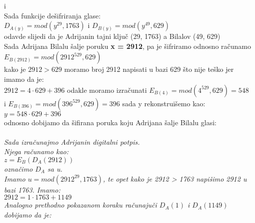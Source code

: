 \documentclass[12pt]{article}
\begin{document}
\begin{enumerate}
\begin{center}
{          i  \\ \vspace{0.25cm} Sada funkcije dešifriranja glase: \\ \vspace{0.15cm} $D_{A(y)} = mod(y^{29}, 1763)$ i $D_{B(y)} = mod(y^{49}, 629)$ \\ \vspace{0.2cm}odavde slijedi da je Adrijanin tajni ključ (29, 1763) a Bilalov (49, 629)\\\vspace{0.20cm} Sada Adrijana Bilalu šalje poruku \textbf{x = 2912}, pa je šifriramo odnosno računamo\\ \vspace{0.15cm} $E_{B(2912)} = mod(2912^{529}, 629)$\\ \vspace{0.15cm} kako je $2912 > 629$ moramo broj 2912 napisati u bazi 629 što nije teško jer imamo da je: \\
         $2912 = 4\cdot629 + 396$ odakle moramo izračunati $E_{B(4)} = mod(4^{529}, 629) = 548$\\ i $E_{B(396)} = mod(396^{529}, 629) = 396$ sada y rekonstruišemo kao:\\
         \vspace{0.15cm} $y = 548 \cdot 629 + 396$\\
         \vspace{0.15cm} odnosno dobijamo da šifirana poruka koju Adrijana šalje Bilalu glasi: \\
         \vspace{0.15cm} }\\
         \vspace{0.5cm}
        \textit{ Sada izračunajmo Adrijanin digitalni potpis.\\Njega računamo  kao: \\ \vspace{0.15cm}
        $z = E_B(D_A(2912))$\\ označimo $D_A$ sa u.\\
        Imamo $u = mod(2912^{29}, 1763)$, te opet kako je 2912 > 1763 napišimo 2912 u bazi 1763. Imamo: \\ \vspace{0.15cm} $2912 = 1\cdot1763 + 1149$\\ \vspace{0.15cm}Analogno prethodno pokazanom koraku računajuči $D_A(1)$ i $D_A(1149)$ dobijamo da je:\\
}
\end{center}
\end{enumerate}
\end{document}
